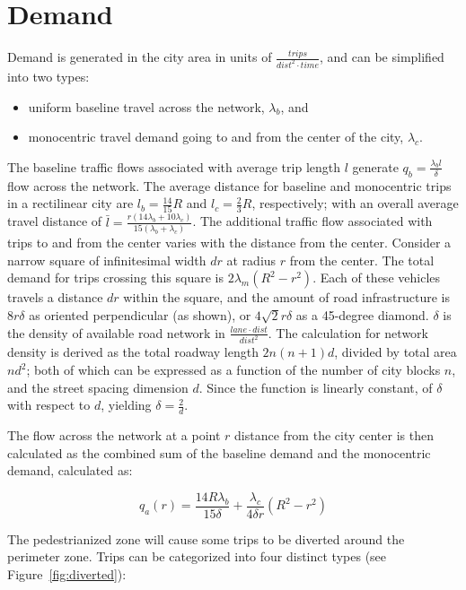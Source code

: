 \documentclass{article}
\begin{document}
\section{Demand}
Demand is generated in the city area in units of $\frac{trips}{dist^2 \cdot time}$, and can be simplified into two types:

\begin{itemize}
    \item uniform baseline travel across the network, $\lambda_b$, and 
    \item monocentric travel demand going to and from the center of the city, $\lambda_c$. 
\end{itemize}

The baseline traffic flows associated with average trip length $l$ generate $q_b = \frac{\lambda_b l}{\delta}$ flow across the network. The average distance for baseline and monocentric trips in a rectilinear city are $l_b=\frac{14}{15}R$ and $l_c=\frac{2}{3}R$, respectively; with an overall average travel distance of $\bar{l} = \frac{r(14\lambda_b + 10\lambda_c)}{15(\lambda_b + \lambda_c)}$. The additional traffic flow associated with trips to and from the center varies with the distance from the center. Consider a narrow square of infinitesimal width $dr$ at radius $r$ from the center. The total demand for trips crossing this square is $2\lambda_m (R^2 - r^2)$. Each of these vehicles travels a distance $dr$ within the square, and the amount of road infrastructure is $8r\delta$ as oriented perpendicular (as shown), or $4\sqrt{2}r\delta$ as a 45-degree diamond. $\delta$ is the density of available road network in $\frac{lane \cdot dist}{dist^2}$. The calculation for network density is derived as the total roadway length $2n(n+1)d$, divided by total area $nd^2$; both of which can be expressed as a function of the number of city blocks $n$, and the street spacing dimension $d$. Since the function is linearly constant, of $\delta$ with respect to $d$, yielding $\delta = \frac{2}{d}$.

The flow across the network at a point $r$ distance from the city center is then calculated as the combined sum of the baseline demand and the monocentric demand, calculated as:

\begin{equation}
    q_a(r) = \frac{14R\lambda_b}{15\delta} + \frac{\lambda_c}{4\delta r} \left(R^2 - r^2 \right)
    \label{eq:flowacross}
\end{equation}


The pedestrianized zone will cause some trips to be diverted around the perimeter zone. Trips can be categorized into four distinct types (see Figure~\ref{fig:diverted}):
\end{document}

